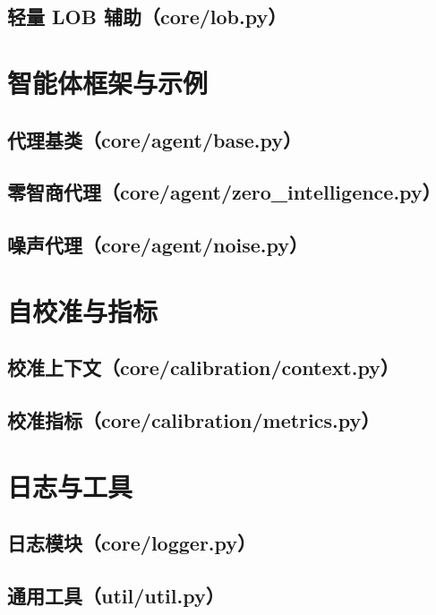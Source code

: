 \documentclass[code]{mancls}
\begin{document}
\subsection{轻量 LOB 辅助（core/lob.py）}


\section{智能体框架与示例}
\subsection{代理基类（core/agent/base.py）}


\subsection{零智商代理（core/agent/zero\_intelligence.py）}


\subsection{噪声代理（core/agent/noise.py）}


\section{自校准与指标}
\subsection{校准上下文（core/calibration/context.py）}


\subsection{校准指标（core/calibration/metrics.py）}


\section{日志与工具}
\subsection{日志模块（core/logger.py）}


\subsection{通用工具（util/util.py）}

\end{document}
